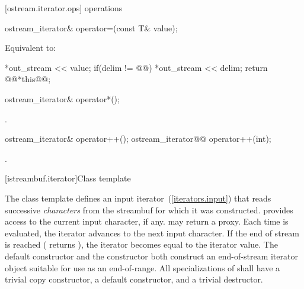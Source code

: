 [ostream.iterator.ops]{ operations}

%
%
\begin{itemdecl}
ostream_iterator& operator=(const T& value);
\end{itemdecl}

\begin{itemdescr}
\pnum
\effects Equivalent to:
\begin{codeblock}
*out_stream << value;
if(delim != @@)
  *out_stream << delim;
return @\removed{(}@*this@\removed{)}@;
\end{codeblock}
\end{itemdescr}

%
%
\begin{itemdecl}
ostream_iterator& operator*();
\end{itemdecl}

\begin{itemdescr}
\pnum
\returns
{}.
\end{itemdescr}

%
%
\begin{itemdecl}
ostream_iterator& operator++();
ostream_iterator@\removed{\&}@ operator++(int);
\end{itemdecl}

\begin{itemdescr}
\pnum
\returns
{}.
\end{itemdescr}

[istreambuf.iterator]{Class template }

\pnum
The
class template
defines an input iterator~(\ref{iterators.input}) that
reads successive
\textit{characters}
from the streambuf for which it was constructed.
provides access to the current input character, if any.
\enternote {} may return a proxy. \exitnote
Each time
is evaluated, the iterator advances to the next input character.
If the end of stream is reached ( returns
),
the iterator becomes equal to the
iterator value.
The default constructor
and the constructor
both construct an end-of-stream iterator object suitable for use
as an end-of-range.
All specializations of  shall have a trivial copy
constructor, a  default constructor, and a trivial destructor.

